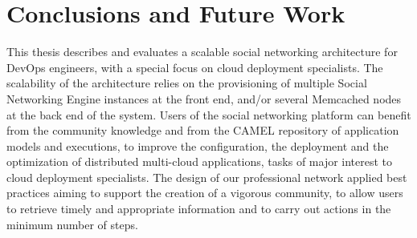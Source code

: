 \chapter{Conclusions and Future Work}
\label{sec:conclusions}
This thesis describes and evaluates a scalable social networking architecture for DevOps engineers, with a special focus on cloud deployment specialists. The scalability of the architecture relies on the provisioning of multiple Social Networking Engine instances at the front end, and/or several Memcached nodes at the back end of the system. Users of the social networking platform can benefit from the community knowledge and from the CAMEL repository of application models and executions, to improve the configuration, the deployment and the
optimization of distributed multi-cloud applications, tasks of major interest to cloud deployment specialists. The design of our professional network applied best practices aiming to support the creation of a vigorous community, to allow users to retrieve timely and appropriate information and to carry out actions in the minimum number of steps.
